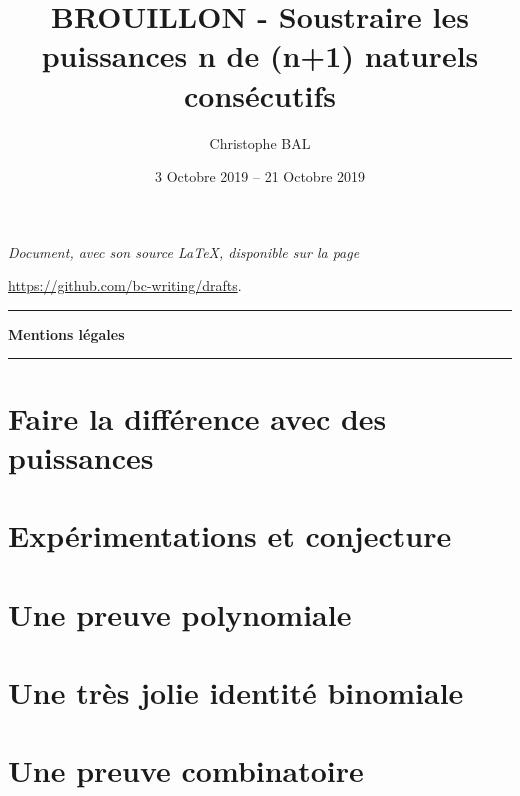 \documentclass[12pt]{amsart}
\begin{document}
\title{BROUILLON - Soustraire les puissances n\ieme{} de (n+1) naturels consécutifs}
\author{Christophe BAL}
\date{3 Octobre 2019 -- 21 Octobre 2019}

\maketitle

\begin{center}
	\itshape
	Document, avec son source \LaTeX, disponible sur la page
	
	\url{https://github.com/bc-writing/drafts}.
\end{center}


\bigskip


\begin{center}
	\hrule\vspace{.3em}
	{
		\fontsize{1.35em}{1em}\selectfont
		\textbf{Mentions \og légales \fg}
	}
			
	\vspace{0.45em}
	\doclicenseThis
	\hrule
\end{center}


\bigskip
\setcounter{tocdepth}{1}
\tableofcontents



\newpage
\section{Faire la différence avec des puissances}






\newpage
\section{Expérimentations et conjecture}





\newpage
\section{Une preuve polynomiale}





\newpage
\section{Une très jolie identité binomiale}




\newpage
\section{Une preuve combinatoire}


\end{document}

